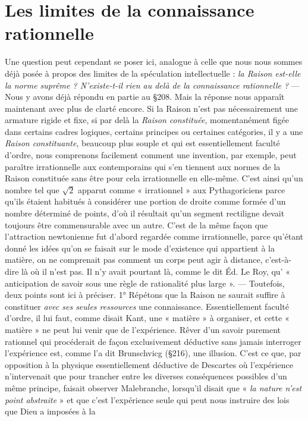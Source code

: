 \section{Les limites de la connaissance rationnelle}%
Une question
peut cependant se poser ici, analogue à celle que nous nous sommes
déjà posée à propos des limites de la spéculation intellectuelle : {\it la
Raison est-elle la norme suprême ? N'existe-t-il rien au delà de la connaissance rationnelle ?} — Nous y avons déjà répondu en partie au \S 208.
Mais la réponse nous apparaît maintenant avec plus de clarté encore.
Si la Raison n’est pas nécessairement une armature rigide et fixe,
si par delà la {\it Raison constituée}, momentanément figée dans certains
cadres logiques, certains principes ou certaines catégories, il y a une
{\it Raison constituante}, beaucoup plus souple et qui est essentiellement
faculté d’ordre, nous comprenons facilement comment une invention,
par exemple, peut paraître irrationnelle aux contemporains qui s’en
tiennent aux normes de la Raison constituée sans être pour cela
irrationnelle en elle-même. C’est ainsi qu’un nombre tel que $\sqrt 2$
apparut comme « irrationnel » aux Pythagoriciens parce qu’ils étaient
habitués à considérer une portion de droite comme formée d’un
nombre déterminé de points, d’où il résultait qu’un segment rectiligne devait toujours être commensurable avec un autre. C'est de
la même façon que l'attraction newtonienne fut d’abord regardée
comme irrationnelle, parce qu’étant donné les idées qu’on se faisait
sur le mode d’existence qui appartient à la matière, on ne comprenait
pas comment un corps peut agir à distance, c’est-à-dire là où il n’est
pas. Il n’y avait pourtant là, comme le dit Éd. Le Roy, qu’ « anticipation de savoir sous une règle de rationalité plus large ». — Toutefois,
deux points sont ici à préciser. 1° Répétons que la Raison ne saurait
suffire à constituer {\it avec ses seules ressources} une connaissance. Essentiellement faculté d'ordre, il lui faut, comme disait Kant, une « matière »
à organiser, et cette « matière » ne peut lui venir que de l’expérience.
Rêver d’un savoir purement rationnel qui procéderait de façon exclusivement déductive sans jamais interroger l'expérience est, comme l’a
dit Brunschvicg (\S 216), une illusion. C’est ce que, par opposition
à la physique essentiellement déductive de Descartes où l’expérience
n’intervenait que pour trancher entre les diverses conséquences
possibles d’un même principe, faisait observer Malebranche, lorsqu'il disait que « {\it la nature n'est point abstraite} » et que c’est l’expérience seule qui peut nous instruire des lois que Dieu a imposées à la
